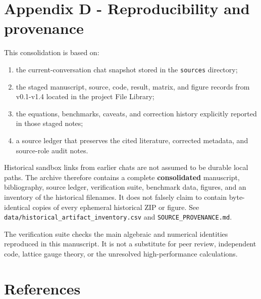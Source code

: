 \documentclass[
]{article}
\providecommand{\tightlist}{%
  \setlength{\itemsep}{0pt}\setlength{\parskip}{0pt}}
\begin{document}
\section{Appendix D - Reproducibility and
provenance}\label{appendix-d---reproducibility-and-provenance}

This consolidation is based on:

\begin{enumerate}
\def\labelenumi{\arabic{enumi}.}
\tightlist
\item
  the current-conversation chat snapshot stored in the \texttt{sources}
  directory;
\item
  the staged manuscript, source, code, result, matrix, and figure
  records from v0.1-v1.4 located in the project File Library;
\item
  the equations, benchmarks, caveats, and correction history explicitly
  reported in those staged notes;
\item
  a source ledger that preserves the cited literature, corrected
  metadata, and source-role audit notes.
\end{enumerate}

Historical sandbox links from earlier chats are not assumed to be
durable local paths. The archive therefore contains a complete
\textbf{consolidated} manuscript, bibliography, source ledger,
verification suite, benchmark data, figures, and an inventory of the
historical filenames. It does not falsely claim to contain
byte-identical copies of every ephemeral historical ZIP or figure. See
\texttt{data/historical\_artifact\_inventory.csv} and
\texttt{SOURCE\_PROVENANCE.md}.

The verification suite checks the main algebraic and numerical
identities reproduced in this manuscript. It is not a substitute for
peer review, independent code, lattice gauge theory, or the unresolved
high-performance calculations.

\section*{References}\label{bibliography}
\end{document}
